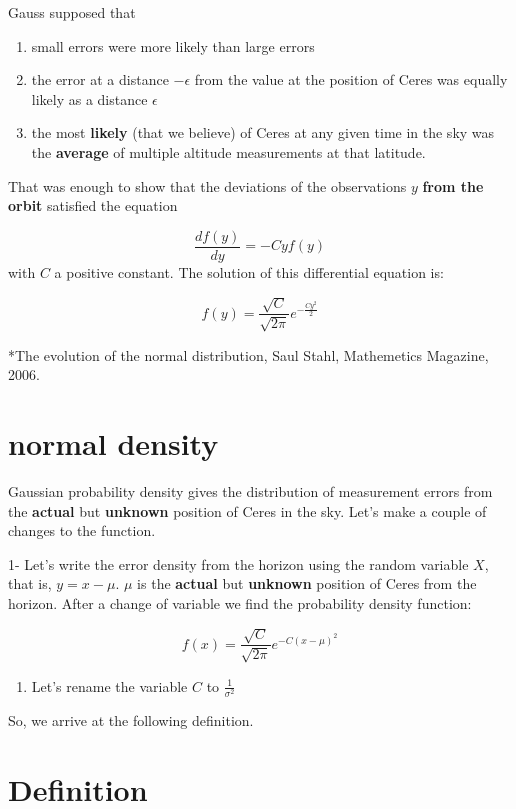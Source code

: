 \documentclass[
]{book}
\providecommand{\tightlist}{%
  \setlength{\itemsep}{0pt}\setlength{\parskip}{0pt}}
\begin{document}
Gauss supposed that

\begin{enumerate}
\def\labelenumi{\arabic{enumi})}
\item
  small errors were more likely than large errors
\item
  the error at a distance \(-\epsilon\) from the value at the position of Ceres was equally likely as a distance \(\epsilon\)
\item
  the most \textbf{likely} (that we believe) of Ceres at any given time in the sky was the \textbf{average} of multiple altitude measurements at that latitude.
\end{enumerate}

That was enough to show that the deviations of the observations \(y\) \textbf{from the orbit} satisfied the equation

\[\frac{df(y)}{dy}=-Cyf(y)\]
with \(C\) a positive constant. The solution of this differential equation is:

\[f(y)=\frac{\sqrt{C}}{\sqrt{2\pi}}e^{-\frac{Cy^2}{2}}\]

*The evolution of the normal distribution, Saul Stahl, Mathemetics Magazine, 2006.

\hypertarget{normal-density}{%
\section{normal density}\label{normal-density}}

Gaussian probability density gives the distribution of measurement errors from the \textbf{actual} but \textbf{unknown} position of Ceres in the sky. Let's make a couple of changes to the function.

1- Let's write the error density from the horizon using the random variable \(X\), that is, \(y=x-\mu\). \(\mu\) is the \textbf{actual} but \textbf{unknown} position of Ceres from the horizon. After a change of variable we find the probability density function:

\[f(x)=\frac{\sqrt{C}}{\sqrt{2\pi}}e^{-C(x-\mu)^2}\]

\begin{enumerate}
\def\labelenumi{\arabic{enumi})}
\setcounter{enumi}{1}
\tightlist
\item
  Let's rename the variable \(C\) to \(\frac{1}{\sigma^2}\)
\end{enumerate}

So, we arrive at the following definition.

\hypertarget{definition}{%
\section{Definition}\label{definition}}
\end{document}
